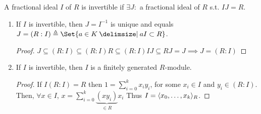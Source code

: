 \begin{definition}
  A fractional ideal $I$ of $R$ is invertible if $\exists J:$ a fractional ideal
  of $R$ s.t. $IJ = R$.
\end{definition}

\begin{prop}\mbox{} \label{prop:property-of-fractional-ideal}
  \begin{enumerate}
    \item If $I$ is invertible, then $J = I^{-1}$ is unique and equals
      $J = (R:I) \triangleq \Set{a \in K \given aI \subset R}$.
      \begin{proof}
        $ J \subseteq (R:I) \subseteq (R:I)R \subseteq (R:I)IJ \subseteq RJ = J
        \implies J = (R:I) $
      \end{proof}
    \item If $I$ is invertible, then $I$ is a finitely generated $R$-module.
      \begin{proof}
        If $I(R:I) = R$ then $1 = \sum\limits_{i = 0}^{k} x_iy_i$, for some $x_i \in I$ and
        $y_i \in (R:I)$. Then, $\forall x \in I$, $x = \sum\limits_{i = 0}^{k} 
        \underbrace{(xy_i)}_{\in R}x_i$ Thus $I = \langle x_0, \dots, x_k\rangle_R$.
      \end{proof}
  \end{enumerate}
\end{prop}

